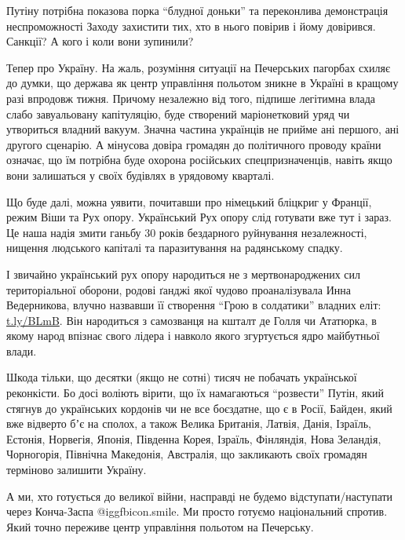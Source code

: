 Путіну потрібна показова порка \enquote{блудної доньки} та переконлива демонстрація
неспроможності Заходу захистити тих, хто в нього повірив і йому довірився.
Санкції? А кого і коли вони зупинили?

Тепер про Україну. На жаль, розуміння ситуації на Печерських пагорбах схиляє до
думки, що держава як центр управління польотом зникне в Україні в кращому разі
впродовж тижня. Причому незалежно від того, підпише легітимна влада слабо
завуальовану капітуляцію, буде створений маріонетковий уряд чи утвориться
владний вакуум. Значна частина українців не прийме ані першого, ані другого
сценарію. А мінусова довіра громадян до політичного проводу країни означає, що
їм потрібна буде охорона російських спецпризначенців, навіть якщо вони
залишаться у своїх будівлях в урядовому кварталі.

Що буде далі, можна уявити, почитавши про німецький бліцкриг у Франції, режим
Віши та Рух опору. Український Рух опору слід готувати вже тут і зараз. Це наша
надія змити ганьбу 30 років бездарного руйнування незалежності, нищення
людського капіталі та паразитування на радянському спадку. 

І звичайно український рух опору народиться не з мертвонароджених сил
територіальної оборони, родові ґанджі якої чудово проаналізувала Инна
Ведерникова, влучно назвавши її створення \enquote{Грою в солдатики} владних еліт:
\url{t.ly/BLmB}. Він народиться з самозванця на кшталт де Голля чи Ататюрка, в якому
народ впізнає свого лідера і навколо якого згуртується ядро майбутньої влади.

Шкода тільки, що десятки (якщо не сотні) тисяч не побачать української
реконкісти. Бо досі воліють вірити, що їх намагаються \enquote{розвести} Путін, який
стягнув до українських кордонів чи не все боєздатне, що є в Росії, Байден, який
вже відверто бʼє на сполох, а також Велика Британія, Латвія, Данія, Ізраїль,
Естонія, Норвегія, Японія, Південна Корея, Ізраїль, Фінляндія, Нова Зеландія,
Чорногорія, Північна Македонія, Австралія, що закликають своїх громадян
терміново залишити Україну.

А ми, хто готується до великої війни, насправді не будемо відступати/наступати
через Конча-Заспа @igg{fbicon.smile}. Ми просто готуємо національний спротив. Який точно
переживе центр управління польотом на Печерську.

